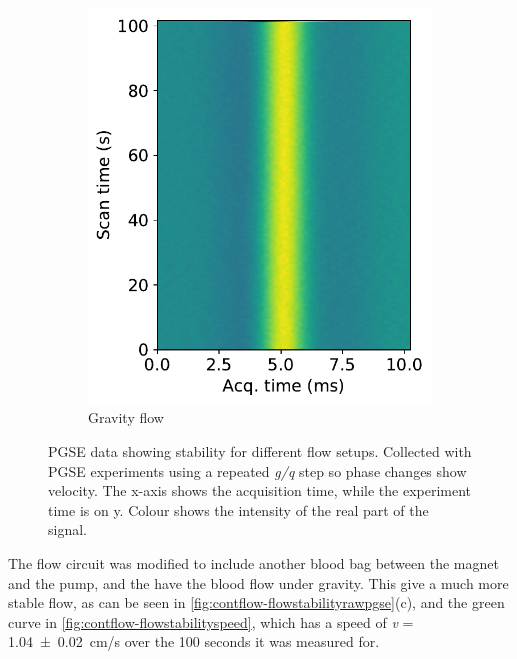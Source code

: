 \begin{figure}[ht]
\begin{subfigure}[t]{0.32\textwidth}
\end{subfigure}
\begin{subfigure}[t]{0.32\textwidth}
\caption{Gravity flow}
\includegraphics[width=\textwidth]{figures/contflow/flowstabilitynewsetup.pdf}
\end{subfigure}

\caption[PGSE data showing flow stability]{PGSE data showing stability for different flow setups. Collected with PGSE experiments using a repeated \textit{g/q} step so phase changes show velocity. The x-axis shows the acquisition time, while the experiment time is on y. Colour shows the intensity of the real part of the signal.}
\label{fig:contflow-flowstabilityrawpgse}
\end{figure}

The flow circuit was modified to include another blood bag between the magnet and the pump, and the have the blood flow under gravity.
This give a much more stable flow, as can be seen in \autoref{fig:contflow-flowstabilityrawpgse}(c), and the green curve in \autoref{fig:contflow-flowstabilityspeed}, which has a speed of \textit{v} = \SI{1.04\pm0.02}{cm/s} over the 100 seconds it was measured for.

